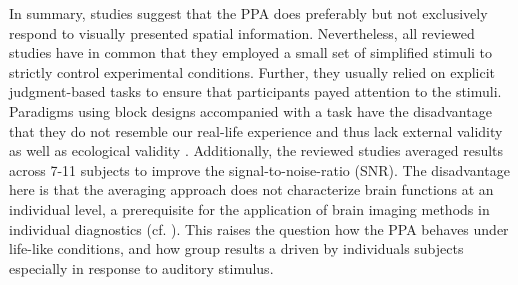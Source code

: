 \documentclass[english]{article}
\begin{document}
In summary, studies suggest that the PPA does preferably but not exclusively
respond to visually presented spatial information.
Nevertheless, all reviewed studies have in common that they employed a small set
of simplified stimuli to strictly control experimental conditions.
Further, they usually relied on explicit judgment-based tasks to ensure that
participants payed attention to the stimuli.
Paradigms using block designs accompanied with a task have the disadvantage that
they do not resemble our real-life experience and thus lack external validity
\citep{westfall2016fixing} as well as ecological validity
\citep{hasson2004intersubject}.
Additionally, the reviewed studies averaged results across 7-11 subjects to
improve the signal-to-noise-ratio (SNR).
The disadvantage here is that the averaging approach does not characterize brain
functions at an individual level, a prerequisite for the application of brain
imaging methods in individual diagnostics (cf. \cite{dubois2016building,
eickhoff2020towards}).
This raises the question how the PPA behaves under life-like conditions, and how
group results a driven by individuals subjects especially in response to
auditory stimulus.
\end{document}
